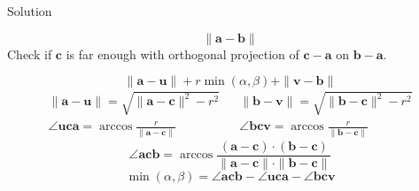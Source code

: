 \documentclass[10pt]{beamer}
\begin{document}
\begin{frame}{Solution}
    \begin{center}
        
    \end{center}
    $$\|\mathbf a- \mathbf b\|$$
    Check if $\mathbf c$ is far enough with orthogonal projection of $\mathbf c - \mathbf a$ on $\mathbf b - \mathbf a$.
\end{frame}

\begin{frame}
    \begin{center}
        
    \end{center}
    $$\|\mathbf a - \mathbf u\| + r\min(\alpha,\beta) + \|\mathbf v - \mathbf b\|$$
    \begin{align*}
        \|\mathbf a - \mathbf u\| = \sqrt{\|\mathbf a - \mathbf c\|^2 - r^2} & & \|\mathbf b - \mathbf v\| = \sqrt{\|\mathbf b - \mathbf c\|^2 - r^2} \\
        \angle \mathbf u \mathbf c \mathbf a = \arccos \frac{r}{\|\mathbf a-\mathbf c\|} & & \angle \mathbf b \mathbf c \mathbf v = \arccos \frac{r}{\|\mathbf b-\mathbf c\|}
    \end{align*}
    $$\angle \mathbf a \mathbf c \mathbf b = \arccos \frac{(\mathbf a - \mathbf c) \cdot (\mathbf b - \mathbf c)}{\|\mathbf a - \mathbf c\| \cdot \|\mathbf b - \mathbf c\|} $$
    $$\min(\alpha, \beta) = \angle \mathbf a \mathbf c \mathbf b - \angle \mathbf u \mathbf c \mathbf a - \angle \mathbf b \mathbf c \mathbf v$$
\end{frame}
\end{document}
